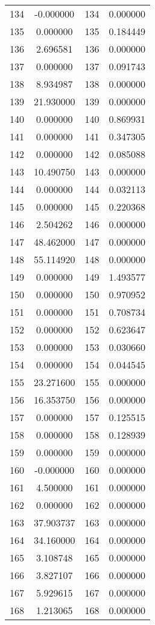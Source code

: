 \documentclass[12pt]{article}
\begin{document}
\begin{longtable}{@{}cccc@{}}
134 & -0.000000 & 134 & 0.000000 \\
135 & 0.000000 & 135 & 0.184449 \\
136 & 2.696581 & 136 & 0.000000 \\
137 & 0.000000 & 137 & 0.091743 \\
138 & 8.934987 & 138 & 0.000000 \\
139 & 21.930000 & 139 & 0.000000 \\
140 & 0.000000 & 140 & 0.869931 \\
141 & 0.000000 & 141 & 0.347305 \\
142 & 0.000000 & 142 & 0.085088 \\
143 & 10.490750 & 143 & 0.000000 \\
144 & 0.000000 & 144 & 0.032113 \\
145 & 0.000000 & 145 & 0.220368 \\
146 & 2.504262 & 146 & 0.000000 \\
147 & 48.462000 & 147 & 0.000000 \\
148 & 55.114920 & 148 & 0.000000 \\
149 & 0.000000 & 149 & 1.493577 \\
150 & 0.000000 & 150 & 0.970952 \\
151 & 0.000000 & 151 & 0.708734 \\
152 & 0.000000 & 152 & 0.623647 \\
153 & 0.000000 & 153 & 0.030660 \\
154 & 0.000000 & 154 & 0.044545 \\
155 & 23.271600 & 155 & 0.000000 \\
156 & 16.353750 & 156 & 0.000000 \\
157 & 0.000000 & 157 & 0.125515 \\
158 & 0.000000 & 158 & 0.128939 \\
159 & 0.000000 & 159 & 0.000000 \\
160 & -0.000000 & 160 & 0.000000 \\
161 & 4.500000 & 161 & 0.000000 \\
162 & 0.000000 & 162 & 0.000000 \\
163 & 37.903737 & 163 & 0.000000 \\
164 & 34.160000 & 164 & 0.000000 \\
165 & 3.108748 & 165 & 0.000000 \\
166 & 3.827107 & 166 & 0.000000 \\
167 & 5.929615 & 167 & 0.000000 \\
168 & 1.213065 & 168 & 0.000000 \\

\end{longtable}
\end{document}
